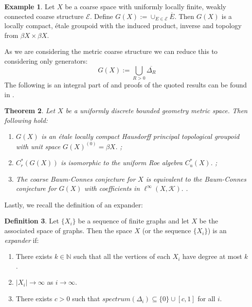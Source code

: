 \documentclass[11pt]{amsart}
\theoremstyle{plain}
\newtheorem{theorem}{Theorem}%
\theoremstyle{definition}%
\newtheorem{definition}[theorem]{Definition}%
\newtheorem{example}[theorem]{Example}%
\theoremstyle{remark}%
\begin{document}
\begin{example}Let $X$ be a coarse space with uniformly locally finite, weakly connected coarse structure $\mathcal{E}$. Define $G(X):=\cup_{E\in \mathcal{E}}\overline{E}.$ Then $G(X)$ is a locally compact, \'etale groupoid with the induced product, inverse and topology from $\beta X \times \beta X$.
\end{example}
As we are considering the metric coarse structure we can reduce this to considering only generators:
\begin{equation*}
G(X):=\bigcup_{R>0}\overline{\Delta_{R}}
\end{equation*}
The following is an integral part of \cite{MR1905840} and proofs of the quoted results can be found in \cite{MR2007488}.
\begin{theorem}
Let $X$ be a uniformly discrete bounded geometry metric space. Then following hold:
\begin{enumerate}
\item $G(X)$ is an \'etale locally compact Hausdorff principal topological groupoid with unit space $G(X)^{(0)}=\beta X$. \cite[Theorem 10.20]{MR2007488}\cite[Proposition 3.2]{MR1905840};
\item $C^{*}_{r}(G(X))$ is isomorphic to the uniform Roe algebra $C^{*}_{u}(X)$. \cite[Proposition 10.29]{MR2007488};
\item The coarse Baum-Connes conjecture for $X$ is equivalent to the Baum-Connes conjecture for $G(X)$ with coefficients in $\ell^{\infty}(X,\mathcal{K})$. \cite[Lemma 4.7]{MR1905840}.
\end{enumerate}
\end{theorem}

Lastly, we recall the definition of an expander:

\begin{definition}
Let $\lbrace X_{i} \rbrace$ be a sequence of finite graphs and let $X$ be the associated space of graphs. Then the space $X$ (or the sequence $\lbrace X_{i} \rbrace$) is an \textit{expander} if:
\begin{enumerate}
\item There exists $k\in \mathbb{N}$ such that all the vertices of each $X_{i}$ have degree at most $k$.
\item $\vert X_{i} \vert \rightarrow \infty$ as $i\rightarrow \infty$.
\item There exists $c>0$ such that $spectrum(\Delta_{i})\subseteq \lbrace 0 \rbrace \cup [c,1]$ for all $i$.
\end{enumerate}
\end{definition}
\end{document}
